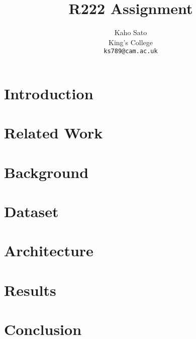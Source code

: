 \documentclass[11pt]{article}
\title{R222 Assignment}
\author{Kaho Sato \\
King's College \\
  {\tt ks789@cam.ac.uk}}
\date{}
\begin{document}
\maketitle

\section{Introduction}
\label{sec:introduction}


\section{Related Work}
\label{sec:related_work}


\section{Background}
\label{sec:background}


\section{Dataset}
\label{sec:dataset}


\section{Architecture}
\label{sec:architecture}


\section{Results}
\label{sec:results}


\section{Conclusion}
\label{sec:conclusion}



\nocite{*}

\end{document}
